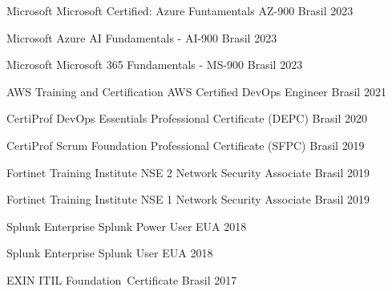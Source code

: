 

\begin{cvhonors}

  \cvhonor
    {Microsoft} %
    {Microsoft Certified: Azure Funtamentals AZ-900} %
    {Brasil} %
    {2023} %

  \cvhonor
    {Microsoft} %
    {Azure AI Fundamentals - AI-900} %
    {Brasil} %
    {2023} %

  \cvhonor
    {Microsoft} %
    {Microsoft 365 Fundamentals - MS-900} %
    {Brasil} %
    {2023} %

  \cvhonor
    {AWS Training and Certification} %
    {AWS Certified DevOps Engineer} %
    {Brasil} %
    {2021} %

  \cvhonor
    {CertiProf} %
    {DevOps Essentials Professional Certificate (DEPC)} %
    {Brasil} %
    {2020} %

  \cvhonor
    {CertiProf} %
    {Scrum Foundation Professional Certificate (SFPC)} %
    {Brasil} %
    {2019} %

  \cvhonor
    {Fortinet Training Institute} %
    {NSE 2 Network Security Associate} %
    {Brasil} %
    {2019} %

  \cvhonor
    {Fortinet Training Institute} %
    {NSE 1 Network Security Associate} %
    {Brasil} %
    {2019} %

  \cvhonor
    {Splunk Enterprise} %
    {Splunk Power User} %
    {EUA} %
    {2018} %

  \cvhonor
    {Splunk Enterprise} %
    {Splunk User} %
    {EUA} %
    {2018} %

  \cvhonor
    {EXIN} %
    {ITIL Foundation Certificate} %
    {Brasil} %
    {2017} %

\end{cvhonors}
